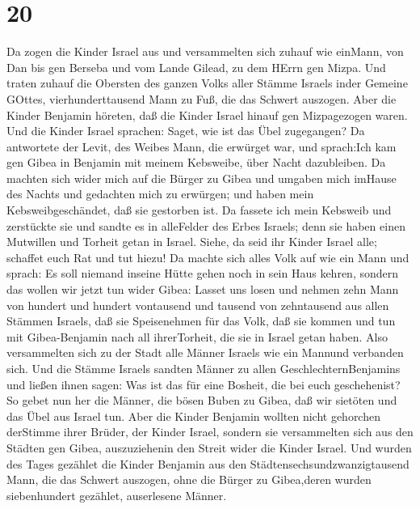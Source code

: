 \hypertarget{section-19}{%
\section{20}\label{section-19}}

 Da zogen die Kinder Israel aus und versammelten sich zuhauf
wie einMann, von Dan bis gen Berseba und vom Lande Gilead, zu dem HErrn
gen Mizpa.  Und traten zuhauf die Obersten des ganzen Volks
aller Stämme Israels inder Gemeine GOttes, vierhunderttausend Mann zu
Fuß, die das Schwert auszogen.  Aber die Kinder Benjamin
höreten, daß die Kinder Israel hinauf gen Mizpagezogen waren. Und die
Kinder Israel sprachen: Saget, wie ist das Übel zugegangen? 
Da antwortete der Levit, des Weibes Mann, die erwürget war, und
sprach:Ich kam gen Gibea in Benjamin mit meinem Kebsweibe, über Nacht
dazubleiben.  Da machten sich wider mich auf die Bürger zu
Gibea und umgaben mich imHause des Nachts und gedachten mich zu
erwürgen; und haben mein Kebsweibgeschändet, daß sie gestorben ist.
 Da fassete ich mein Kebsweib und zerstückte sie und sandte
es in alleFelder des Erbes Israels; denn sie haben einen Mutwillen und
Torheit getan in Israel.  Siehe, da seid ihr Kinder Israel
alle; schaffet euch Rat und tut hiezu!  Da machte sich alles
Volk auf wie ein Mann und sprach: Es soll niemand inseine Hütte gehen
noch in sein Haus kehren,  sondern das wollen wir jetzt tun
wider Gibea:  Lasset uns losen und nehmen zehn Mann von
hundert und hundert vontausend und tausend von zehntausend aus allen
Stämmen Israels, daß sie Speisenehmen für das Volk, daß sie kommen und
tun mit Gibea-Benjamin nach all ihrerTorheit, die sie in Israel getan
haben.  Also versammelten sich zu der Stadt alle Männer
Israels wie ein Mannund verbanden sich.  Und die Stämme
Israels sandten Männer zu allen GeschlechternBenjamins und ließen ihnen
sagen: Was ist das für eine Bosheit, die bei euch geschehenist?
 So gebet nun her die Männer, die bösen Buben zu Gibea, daß
wir sietöten und das Übel aus Israel tun. Aber die Kinder Benjamin
wollten nicht gehorchen derStimme ihrer Brüder, der Kinder Israel,
 sondern sie versammelten sich aus den Städten gen Gibea,
auszuziehenin den Streit wider die Kinder Israel.  Und
wurden des Tages gezählet die Kinder Benjamin aus den
Städtensechsundzwanzigtausend Mann, die das Schwert auszogen, ohne die
Bürger zu Gibea,deren wurden siebenhundert gezählet, auserlesene Männer.

